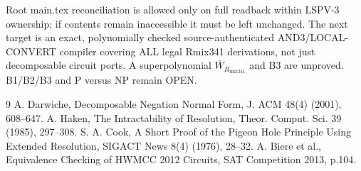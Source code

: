 \documentclass[11pt]{article}
\begin{document}
Root main.tex reconciliation is allowed only on full readback within LSPV-3 ownership; if contents remain inaccessible it must be left unchanged. The next target is an exact, polynomially checked source-authenticated AND3/LOCAL-CONVERT compiler covering ALL legal Rmix341 derivations, not just decomposable circuit ports. A superpolynomial \(\overline W_{R_{\mathrm{mix341}}}\) and B3 are unproved. B1/B2/B3 and P versus NP remain OPEN.
\begin{thebibliography}{9}
 A. Darwiche, Decomposable Negation Normal Form, J. ACM 48(4) (2001), 608--647.
 A. Haken, The Intractability of Resolution, Theor. Comput. Sci. 39 (1985), 297--308.
 S. A. Cook, A Short Proof of the Pigeon Hole Principle Using Extended Resolution, SIGACT News 8(4) (1976), 28--32.
 A. Biere et al., Equivalence Checking of HWMCC 2012 Circuits, SAT Competition 2013, p.104.
\end{thebibliography}
\end{document}
